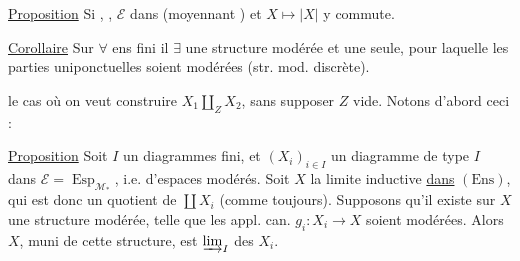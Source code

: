 \uline{Proposition} Si , ,  $\mathcal E$
 dans 
 (moyennant ) et $X\mapsto|X|$ y commute.

\uline{Corollaire} Sur $\forall$ ens fini il $\exists$ une structure modérée et une seule, pour laquelle les parties uniponctuelles soient modérées (str. mod. discrète).

 le cas où on veut construire $X_1\amalg_Z X_2$, sans supposer $Z$ vide. Notons d'abord ceci :

\uline{Proposition} Soit $I$ un   diagrammes fini, et $(X_i)_{i\in I}$ un diagramme de type $I$ dans $\mathcal E=\operatorname{Esp}_{\mathcal M_*}$, i.e. d'espaces modérés. Soit $X$ la limite inductive \uline{dans} $(\mathrm{Ens})$, qui est donc un  quotient de $\coprod X_i$ (comme toujours). Supposons qu'il existe sur $X$ une structure modérée, telle que les appl. can. $g_i:X_i\longrightarrow X$ soient modérées. Alors $X$, muni de cette structure, est  $\varinjlim_I$ des $X_i$.
